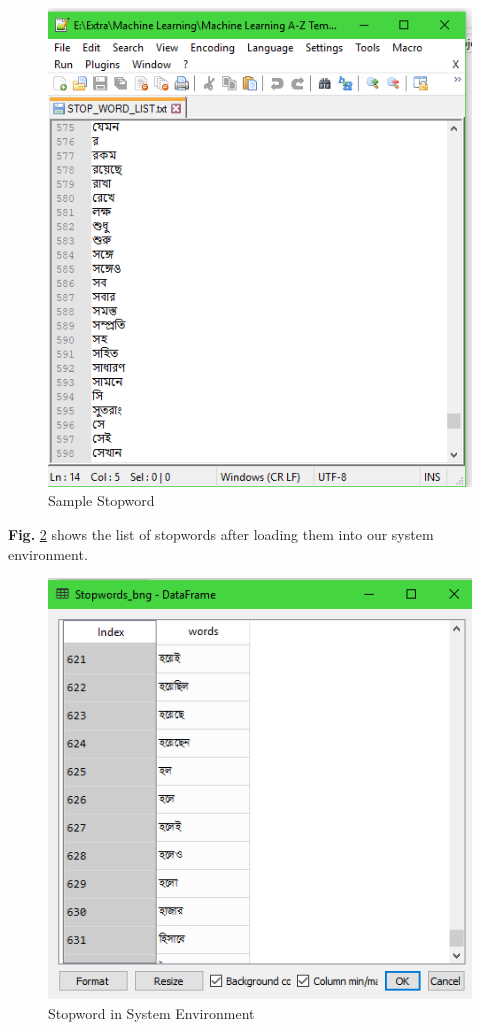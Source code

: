 \begin{figure}[h!]
    \centering
    \includegraphics[scale=0.55]{Figures/stp_wrd.PNG}
    \caption{Sample Stopword}
    \label{fig:stpw}
\end{figure}
\par\noindent

\textbf{Fig.} \ref{fig:lstpw} shows the list of stopwords after loading them into our system environment.
\begin{figure}[h!]
    \centering
    \includegraphics[scale=0.6]{Figures/lstp_wrd.PNG}
    \caption{Stopword in System Environment}
    \label{fig:lstpw}
\end{figure}
